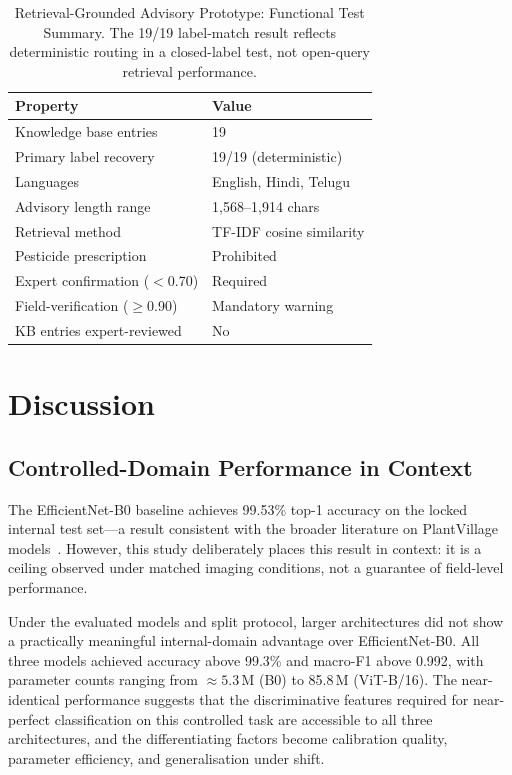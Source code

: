 \documentclass[conference]{IEEEtran}
\begin{document}
\begin{table}[!t]
\caption{Retrieval-Grounded Advisory Prototype: Functional Test
Summary. The 19/19 label-match result reflects deterministic routing
in a closed-label test, not open-query retrieval performance.}
\label{tab:rag_validation}
\centering
\small
\begin{tabular}{ll}
\toprule
\textbf{Property} & \textbf{Value} \\
\midrule
Knowledge base entries & 19 \\
Primary label recovery & 19/19 (deterministic) \\
Languages & English, Hindi, Telugu \\
Advisory length range & 1{,}568--1{,}914 chars \\
Retrieval method & TF-IDF cosine similarity \\
Pesticide prescription & Prohibited \\
Expert confirmation ($<$0.70) & Required \\
Field-verification ($\geq$0.90) & Mandatory warning \\
KB entries expert-reviewed & No \\
\bottomrule
\end{tabular}
\end{table}

\section{Discussion}
\label{sec:discussion}

\subsection{Controlled-Domain Performance in Context}

The EfficientNet-B0 baseline achieves 99.53\% top-1 accuracy on the
locked internal test set---a result consistent with the broader
literature on PlantVillage
models~\cite{mohanty2016deep,too2019comparative,ferentinos2018deep}.
However, this study deliberately places this result in context: it is
a ceiling observed under matched imaging conditions, not a guarantee
of field-level performance.

Under the evaluated models and split protocol, larger architectures
did not show a practically meaningful internal-domain advantage over
EfficientNet-B0. All three models achieved accuracy above 99.3\% and
macro-F1 above 0.992, with parameter counts ranging from
${\approx}5.3$\,M (B0) to 85.8\,M (ViT-B/16). The near-identical
performance suggests that the discriminative features required for
near-perfect classification on this controlled task are accessible to
all three architectures, and the differentiating factors become
calibration quality, parameter efficiency, and generalisation under
shift.
\end{document}
